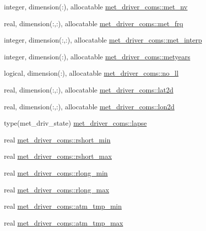 \begin{DoxyCompactItemize}
\item 
integer, dimension(\+:), allocatable \hyperlink{namespacemet__driver__coms_ad177e131d2e207ace5152559e6a81e50}{met\+\_\+driver\+\_\+coms\+::met\+\_\+nv}
\item 
real, dimension(\+:,\+:), allocatable \hyperlink{namespacemet__driver__coms_ab40b47c4228b3048c656a3c9b6040a16}{met\+\_\+driver\+\_\+coms\+::met\+\_\+frq}
\item 
integer, dimension(\+:,\+:), allocatable \hyperlink{namespacemet__driver__coms_a191cf5c1e76eb2c2a3327598a5edcd8a}{met\+\_\+driver\+\_\+coms\+::met\+\_\+interp}
\item 
integer, dimension(\+:), allocatable \hyperlink{namespacemet__driver__coms_af128086aff438c098cbb171df11b5b50}{met\+\_\+driver\+\_\+coms\+::metyears}
\item 
logical, dimension(\+:), allocatable \hyperlink{namespacemet__driver__coms_a593e5e00920bf69cc5606914b9af1441}{met\+\_\+driver\+\_\+coms\+::no\+\_\+ll}
\item 
real, dimension(\+:,\+:), allocatable \hyperlink{namespacemet__driver__coms_ad4ba08a0bb7a7d239acca24ad643df43}{met\+\_\+driver\+\_\+coms\+::lat2d}
\item 
real, dimension(\+:,\+:), allocatable \hyperlink{namespacemet__driver__coms_a86a7d638d5a38f95de4804d9e6b72f86}{met\+\_\+driver\+\_\+coms\+::lon2d}
\item 
type(met\+\_\+driv\+\_\+state) \hyperlink{namespacemet__driver__coms_a685acd690e0892bcfd7a506c166c17a2}{met\+\_\+driver\+\_\+coms\+::lapse}
\item 
real \hyperlink{namespacemet__driver__coms_a013356bcc8073da8ae3d49d5976638ea}{met\+\_\+driver\+\_\+coms\+::rshort\+\_\+min}
\item 
real \hyperlink{namespacemet__driver__coms_a219937d69ab4b750cfc581131fcb919d}{met\+\_\+driver\+\_\+coms\+::rshort\+\_\+max}
\item 
real \hyperlink{namespacemet__driver__coms_a3b4038f5f9bd27b10804eb3708f59eee}{met\+\_\+driver\+\_\+coms\+::rlong\+\_\+min}
\item 
real \hyperlink{namespacemet__driver__coms_aae1dfc2e08ed7190ca55f26184c58808}{met\+\_\+driver\+\_\+coms\+::rlong\+\_\+max}
\item 
real \hyperlink{namespacemet__driver__coms_a3012153d59cb39b7b6b7d2cb707960f1}{met\+\_\+driver\+\_\+coms\+::atm\+\_\+tmp\+\_\+min}
\item 
real \hyperlink{namespacemet__driver__coms_a672d84e38ae3a305d1b2b616cc40fd65}{met\+\_\+driver\+\_\+coms\+::atm\+\_\+tmp\+\_\+max}

\end{DoxyCompactItemize}
